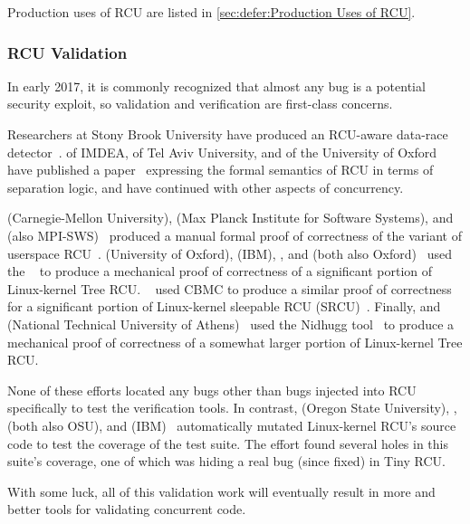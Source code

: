 Production uses of RCU are listed in
\cref{sec:defer:Production Uses of RCU}.

\subsubsection{RCU Validation}
\label{sec:defer:RCU Validation}

In early 2017, it is commonly recognized that almost any bug is a potential
security exploit, so validation and verification are first-class concerns.

Researchers at Stony Brook University have produced an RCU-aware data-race
detector~\cite{AbhinavDuggal2010Masters,JustinSeyster2012PhD,Seyster:2011:RFA:2075416.2075425}.
 of IMDEA,  of Tel Aviv University,
and  of the University of Oxford have published a
paper~\cite{AlexeyGotsman2012VerifyGraceExtended} expressing the formal
semantics of RCU in terms of separation logic, and have continued with
other aspects of concurrency.

 (Carnegie-Mellon University),  (Max
Planck Institute for Software Systems), and 
(also MPI-SWS)~\cite{JosephTassarotti2015RCUproof}
produced a manual formal proof of correctness of the 
variant of userspace
RCU~\cite{MathieuDesnoyers2009URCU,MathieuDesnoyers2012URCU}.
 (University of Oxford),  (IBM),
, and 
(both also Oxford)~\cite{LihaoLiang2016VerifyTreeRCU}
used the ~\cite{EdmundClarke2004CBMC}
to produce a mechanical proof of correctness of a significant portion
of Linux-kernel Tree RCU\@.
~\cite{LanceRoy2017CBMC-SRCU} used CBMC to produce a similar
proof of correctness for a significant portion of Linux-kernel
sleepable RCU (SRCU)~\cite{PaulEMcKenney2006c}.
Finally,  and 
(National Technical University of
Athens)~\cite{MichalisKokologiannakis2017NidhuggRCU,MichalisKokologiannakis2019RCUstatelessModelCheck}
used the Nidhugg tool~\cite{CarlLeonardsson2014Nidhugg}
to produce a mechanical proof of correctness of a somewhat larger
portion of Linux-kernel Tree RCU\@.

None of these efforts located any bugs other than bugs injected into
RCU specifically to test the verification tools.
In contrast,
 (Oregon State University), ,
 (both also OSU), and 
(IBM)~\cite{Groce:2015:VMC:2916135.2916190}
automatically mutated Linux-kernel RCU's source code to test the
coverage of the  test suite.
The effort found several holes in this suite's coverage, one of which
was hiding a real bug (since fixed) in Tiny RCU\@.

With some luck, all of this validation work will eventually result in
more and better tools for validating concurrent code.
